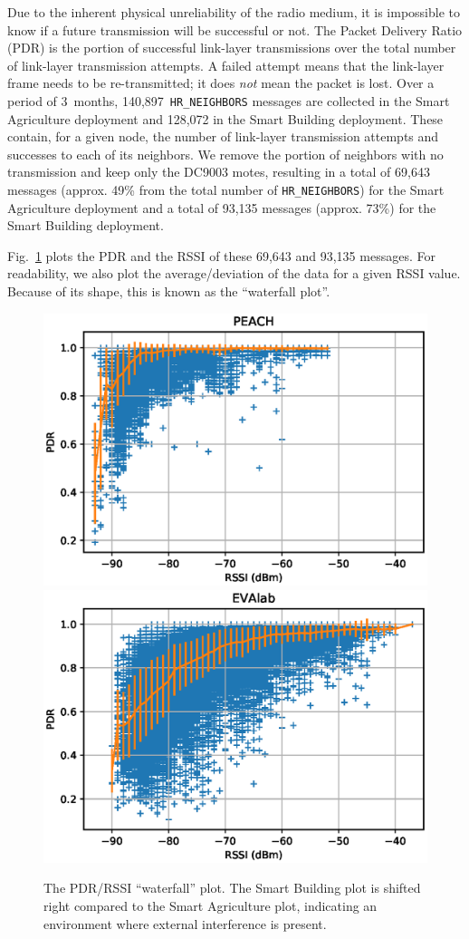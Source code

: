 \documentclass{elsarticle}
\newcommand{\building}            {Smart Building\xspace}
\newcommand{\agri}                {Smart Agriculture\xspace}
\newcommand{\HRNEIGHBORS}         {{\tt HR\_NEIGHBORS}\xspace}
\newcommand{\PEACHNUMHRNEIGHBORS} {140,897\xspace}
\newcommand{\EVANUMHRNEIGHBORS}   {128,072\xspace}
\begin{document}

Due to the inherent physical unreliability of the radio medium, it is impossible to know if a future transmission will be successful or not.
The Packet Delivery Ratio (PDR) is the portion of successful link-layer transmissions over the total number of link-layer transmission attempts.
A failed attempt means that the link-layer frame needs to be re-transmitted; it does \textit{not} mean the packet is lost.
Over a period of 3~months, \PEACHNUMHRNEIGHBORS~\HRNEIGHBORS messages are collected in the \agri deployment and \EVANUMHRNEIGHBORS in the \building deployment.
These contain, for a given node, the number of link-layer transmission attempts and successes to each of its neighbors.
We remove the portion of neighbors with no transmission and keep only the DC9003 motes, resulting in a total of 69,643 messages (approx. 49\% from the total number of \HRNEIGHBORS) for the \agri deployment and a total of 93,135 messages (approx. 73\%) for the \building deployment.


Fig.~\ref{fig:waterfall} plots the PDR and the RSSI of these 69,643 and 93,135 messages.
For readability, we also plot the average/deviation of the data for a given RSSI value.
Because of its shape, this is known as the ``waterfall plot''.

\begin{figure}
    \includegraphics[width=0.5\columnwidth]{waterfall_peach.eps}
    \includegraphics[width=0.5\columnwidth]{waterfall.eps}
    \caption{
        The PDR/RSSI ``waterfall'' plot.
        The \building plot is shifted right compared to the \agri plot, indicating an environment where external interference is present.
    }
    \label{fig:waterfall}
\end{figure}
\end{document}
